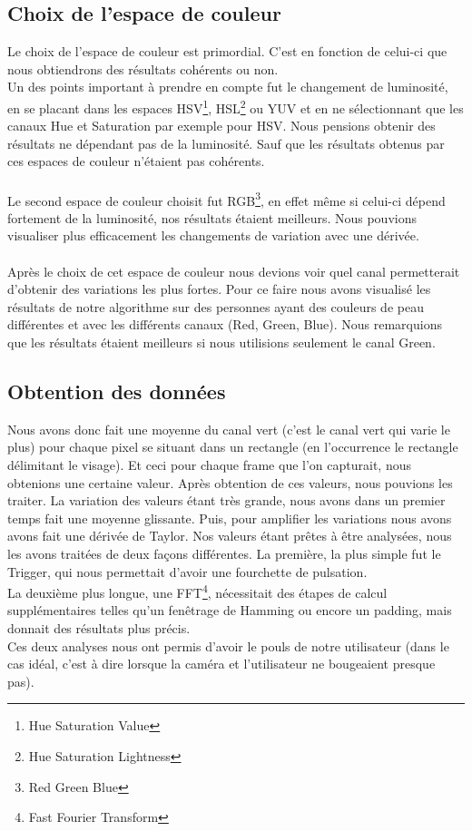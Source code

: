  \subsection{Choix de l'espace de couleur}
 Le choix de l'espace de couleur est primordial. C'est en fonction de celui-ci que nous obtiendrons des résultats cohérents ou non.\\
 Un des points important à prendre en compte fut le changement de luminosité, en se placant dans les espaces HSV\footnote{Hue Saturation Value}, HSL\footnote{Hue Saturation Lightness} ou YUV et en ne sélectionnant que les canaux Hue et Saturation par exemple pour HSV. Nous
  pensions obtenir des résultats ne dépendant pas de la luminosité. Sauf que les résultats obtenus par ces espaces de couleur n'étaient pas cohérents.\\
 \\
 Le second espace de couleur choisit fut RGB\footnote{Red Green Blue}, en effet même si celui-ci dépend fortement de la luminosité, nos résultats étaient meilleurs. Nous pouvions visualiser plus efficacement les changements de
 variation avec une dérivée.\\
 \\
 Après le choix de cet espace de couleur nous devions voir quel canal permetterait d'obtenir des variations les plus fortes. Pour ce faire nous avons visualisé les résultats de notre algorithme sur des personnes ayant des couleurs de peau différentes et avec les différents canaux (Red, Green, Blue). Nous remarquions que les résultats étaient meilleurs si nous utilisions seulement le canal Green.


 \subsection{Obtention des données}
 Nous avons donc fait une moyenne du canal vert (c'est le canal vert qui varie le plus) pour chaque pixel se situant dans un rectangle (en l’occurrence le rectangle délimitant le visage).
 Et ceci pour chaque frame que l'on capturait, nous obtenions une certaine valeur.
 Après obtention de ces valeurs, nous pouvions les traiter.
 La variation des valeurs étant très grande, nous avons dans un premier temps fait une moyenne glissante. Puis, pour amplifier les variations nous avons avons fait une dérivée de Taylor.
 Nos valeurs étant prêtes à être analysées, nous les avons traitées de deux façons différentes.
 La première, la plus simple fut le Trigger, qui nous permettait d'avoir une fourchette de pulsation.\\ La deuxième plus longue, une FFT\footnote{Fast Fourier Transform}, nécessitait des étapes de calcul supplémentaires telles qu'un fenêtrage de Hamming ou encore un padding, mais donnait des résultats plus précis.
 \\
 Ces deux analyses nous ont permis d'avoir le pouls de notre utilisateur (dans le cas idéal, c'est à dire lorsque la caméra et l'utilisateur ne bougeaient presque pas).
 \\

